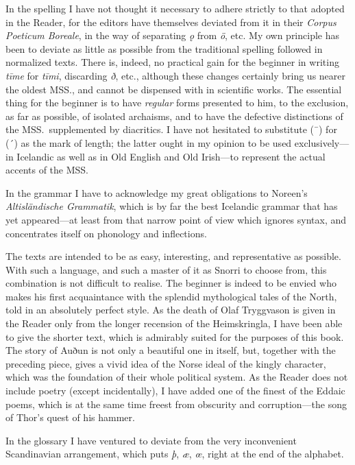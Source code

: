 \documentclass[12pt,letterpaper]{book}
\begin{document}
In the spelling I have not thought it necessary to adhere
strictly to that adopted in the Reader, for the editors have
themselves deviated from it in their \textit{Corpus Poeticum
Boreale}, in the way of separating \textit{ǫ} from \textit{ö}, etc.
My own principle has been to deviate as little as possible from the
traditional spelling followed in normalized texts.  There is, indeed, no
practical gain for the beginner in writing \textit{tīme} for \textit{tīmi},
discarding \textit{ð}, etc., although these changes certainly bring us
nearer the oldest MSS., and cannot be dispensed with in
scientific works.  The essential thing for the beginner is to
have \textit{regular} forms presented to him, to the exclusion, as far
as possible, of isolated archaisms, and to have the defective
distinctions of the MSS.\ supplemented by diacritics.  I have not
hesitated to substitute (¯) for (´) as the mark of length; the
latter ought in my opinion to be used exclusively---in Icelandic
as well as in Old English and Old Irish---to represent the actual
accents of the MSS.

In the grammar I have to acknowledge my great obligations to
Noreen's \textit{Altisländische Grammatik}, which is by far the best
Icelandic grammar that has yet appeared---at least from that
narrow point of view which ignores syntax, and concentrates
itself on phonology and inflections.

The texts are intended to be as easy, interesting, and
representative as possible.  With such a language, and such a
master of it as Snorri to choose from, this combination is not
difficult to realise.  The beginner is indeed to be envied who
makes his first acquaintance with the splendid mythological tales
of the North, told in an absolutely perfect style.  As the death
of Olaf Tryggvason is given in the Reader only from the longer
recension of the Heimskringla, I have been able to give the
shorter text, which is admirably suited for the purposes of this
book.  The story of Auðun is not only a beautiful one in itself,
but, together with the preceding piece, gives a vivid idea of the
Norse ideal of the kingly character, which was the foundation of
their whole political system.  As the Reader does not include
poetry (except incidentally), I have added one of the finest of
the Eddaic poems, which is at the same time freest from obscurity
and corruption---the song of Thor's quest of his hammer.

In the glossary I have ventured to deviate from the very
inconvenient Scandinavian arrangement, which puts \textit{þ},
\textit{æ}, \textit{œ}, right at the end of the alphabet.
\end{document}
